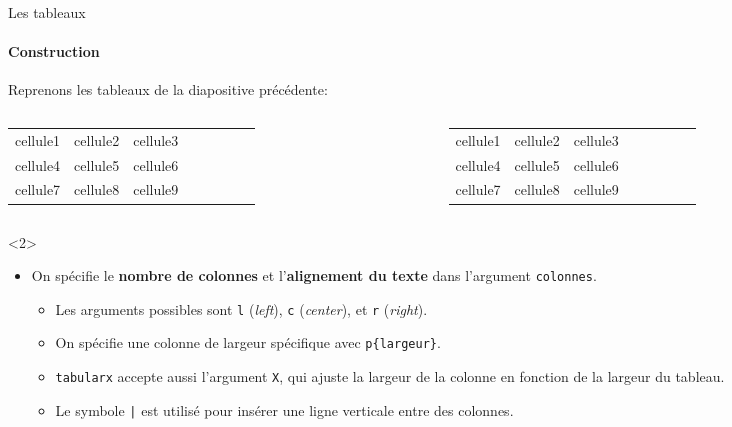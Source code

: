 \begin{frame}[fragile]{Les tableaux}
	\framesubtitle{Construction}
	Reprenons les tableaux de la diapositive précédente:
	
	\begin{columns}
		\begin{column}{.49\textwidth}
			\begin{codesource}
				\begin{tabular}{colonnes}
					cellule1 & cellule2 & cellule3 \\
					cellule4 & cellule5 & cellule6 \\
					cellule7 & cellule8 & cellule9
				\end{tabular}
			\end{codesource}
		\end{column}
		\begin{column}{.49\textwidth}
			\begin{codesource}
				\begin{tabular*}{largeur}{colonnes}
					cellule1 & cellule2 & cellule3 \\
					cellule4 & cellule5 & cellule6 \\
					cellule7 & cellule8 & cellule9
				\end{tabular*}
			\end{codesource}
		\end{column}
	\end{columns}

	\begin{onlyenv}
		\begin{itemize}
			\item On spécifie le \textbf{nombre de colonnes} et l'\textbf{alignement du texte} dans l'argument \texttt{colonnes}.
			\begin{itemize}
				\scriptsize
				\item Les arguments possibles sont \texttt{l} (\emph{left}), \texttt{c} (\emph{center}),
					et \texttt{r} (\emph{right}).
				\item On spécifie une colonne de largeur spécifique avec \texttt{p\{largeur\}}.
				\item \texttt{tabularx} accepte aussi l'argument \texttt{X}, qui ajuste la largeur de la
					colonne en fonction de la largeur du tableau.
				\item Le symbole \texttt{|} est utilisé pour insérer une ligne verticale entre des colonnes.
			\end{itemize}
		\end{itemize}
	\end{onlyenv}


\end{frame}
